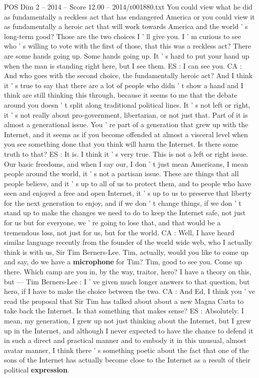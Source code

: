 \begin{textsample}{POS Dim 2 – 2014 – Score 12.00 – 2014/t001880.txt}
You could view what he did as fundamentally a reckless act that has endangered America or you could view it as fundamentally a heroic act that will work towards America and the world ' s long-term good?
Those are the two choices I ' ll give you.
I ' m curious to see who ' s willing to vote with the first of those, that this was a reckless act?
There are some hands going up.
Some hands going up.
It ' s hard to put your hand up when the man is standing right here, but I see them.
ES : I can see you.
CA : And who goes with the second choice, the fundamentally heroic act?
And I think it ' s true to say that there are a lot of people who didn ' t show a hand and I think are still thinking this through, because it seems to me that the debate around you doesn ' t split along traditional political lines.
It ' s not left or right, it ' s not really about pro-government, libertarian, or not just that.
Part of it is almost a generational issue.
You ' re part of a generation that grew up with the Internet, and it seems as if you become offended at almost a visceral level when you see something done that you think will harm the Internet.
Is there some truth to that?
ES : It is.
I think it ' s very true.
This is not a left or right issue.
Our basic freedoms, and when I say our, I don ' t just mean Americans, I mean people around the world, it ' s not a partisan issue.
These are things that all people believe, and it ' s up to all of us to protect them, and to people who have seen and enjoyed a free and open Internet, it ' s up to us to preserve that liberty for the next generation to enjoy, and if we don ' t change things, if we don ' t stand up to make the changes we need to do to keep the Internet safe, not just for us but for everyone, we ' re going to lose that, and that would be a tremendous loss, not just for us, but for the world.
CA : Well, I have heard similar language recently from the founder of the world wide web, who I actually think is with us, Sir Tim Berners-Lee.
Tim, actually, would you like to come up and say, do we have a \textbf{microphone} for Tim?
Tim, good to see you.
Come up there.
Which camp are you in, by the way, traitor, hero?
I have a theory on this, but — Tim Berners-Lee : I ' ve given much longer answers to that question, but hero, if I have to make the choice between the two.
CA : And Ed, I think you ' ve read the proposal that Sir Tim has talked about about a new Magna Carta to take back the Internet.
Is that something that makes sense?
ES : Absolutely.
I mean, my generation, I grew up not just thinking about the Internet, but I grew up in the Internet, and although I never expected to have the chance to defend it in such a direct and practical manner and to embody it in this unusual, almost avatar manner, I think there ' s something poetic about the fact that one of the sons of the Internet has actually become close to the Internet as a result of their political \textbf{expression}.

\end{textsample}
